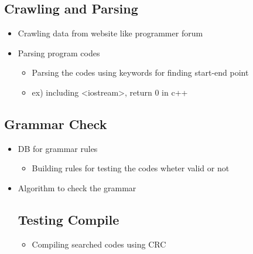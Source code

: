 \documentclass[conference]{IEEEtran}
\begin{document}
\subsection{Crawling and Parsing}
\begin{itemize}
  \item Crawling data from website like programmer forum
  \item Parsing program codes
  \begin{itemize}
    \item Parsing the codes using keywords for finding start-end point
    \item ex) including <iostream>, return 0 in c++
  \end{itemize}
\end{itemize}
\textit{ }

\subsection{Grammar Check}
\begin{itemize}
  \item DB for grammar rules
  \begin{itemize}
    \item Building rules for testing the codes wheter valid or not
  \end{itemize}
  \item Algorithm to check the grammar
\textit{ }
 \subsection{Testing Compile}
  \begin{itemize}
    \item Compiling searched codes using CRC
  \end{itemize}
\end{itemize}
\textit{ }





\end{document}

